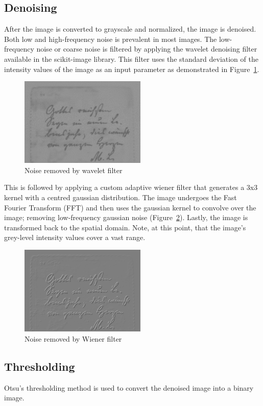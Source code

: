 \documentclass[a4paper, 12pt]{report}
\begin{document}
\subsection{Denoising}
After the image is converted to grayscale and normalized, the image is denoised. Both low and high-frequency noise is prevalent in most images. The low-frequency noise or coarse noise is filtered by applying the wavelet denoising filter available in the scikit-image library. This filter uses the standard deviation of the intensity values of the image as an input parameter as demonstrated in Figure~\ref{fig:2}.

\begin{figure}[ht]
    \centering
    \includegraphics[width=6cm]{wavelet difference.png}
    \caption{Noise removed by wavelet filter}
    \label{fig:2}
\end{figure}

This is followed by applying a custom adaptive wiener filter that generates a 3x3 kernel with a centred gaussian distribution. The image undergoes the Fast Fourier Transform (FFT) and then uses the gaussian kernel to convolve over the image; removing low-frequency gaussian noise (Figure~\ref{fig:3}). Lastly, the image is transformed back to the spatial domain. Note, at this point, that the image's grey-level intensity values cover a vast range.

\begin{figure}[ht]
    \centering
    \includegraphics[width=6cm]{wiener difference.png}
    \caption{Noise removed by Wiener filter}
    \label{fig:3}
\end{figure}

\subsection{Thresholding}
Otsu's thresholding method is used to convert the denoised image into a binary image.
\end{document}

